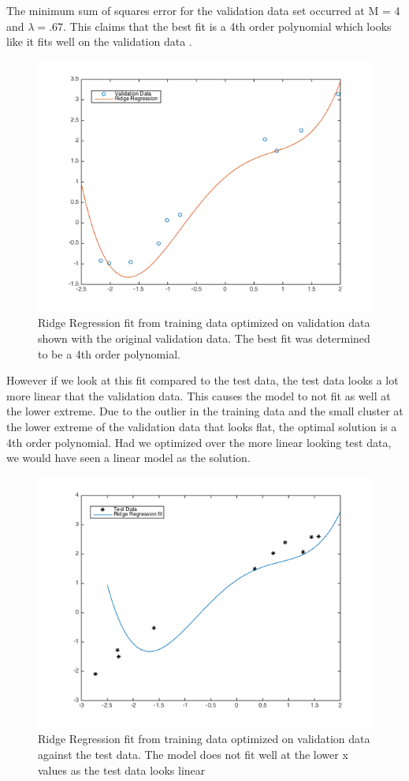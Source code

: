 \documentclass[10pt,twocolumn]{article}
\begin{document}
The minimum sum of squares error for the validation data set occurred at M = 4 and $\lambda = .67$. This claims that the best fit is a 4th order polynomial which looks like it fits well on the validation data .
\begin{figure}[H]
\center
\includegraphics[scale =.4]{valplot.png}
\caption{Ridge Regression fit from training data optimized on validation data shown with the original validation data. The best fit was determined to be a 4th order polynomial.}
\end{figure}

However if we look at this fit compared to the test data, the test data looks a lot more linear that the validation data. This causes the model to not fit as well at the lower extreme.  Due to the outlier in the training data and the small cluster at the lower extreme of the validation data that looks flat, the optimal solution is a 4th order polynomial. Had we optimized over the more linear looking test data, we would have seen a linear model as the solution. 

\begin{figure}[H]
\center
\includegraphics[scale =.4]{testplot.png}
\caption{Ridge Regression fit from training data optimized on validation data against the test data. The model does not fit well at the lower x values as the test data looks linear }
\end{figure}
\end{document}
